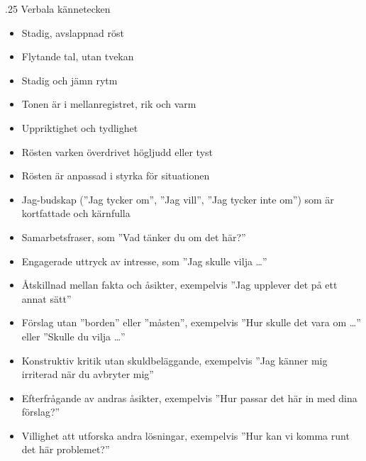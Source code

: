 \documentclass[swedish,a4paper]{book}
\makeatletter
\renewcommand\subsection{\@startsection{subsection}{1}{\z@}%
                                   {\baselineskip}%
                                   {.25\baselineskip}%
                                   {\fontsize{1\baselineskip}{1.25\baselineskip}\selectfont\sffamily\bfseries}} %
\makeatother
\begin{document}
\subsection{Verbala kännetecken}

\begin{itemize}

\item Stadig, avslappnad röst

\item Flytande tal, utan tvekan

\item Stadig och jämn rytm

\item Tonen är i mellanregistret, rik och varm

\item Uppriktighet och tydlighet

\item Rösten varken överdrivet högljudd eller tyst

\item Rösten är anpassad i styrka för situationen

\item Jag-budskap (''Jag tycker om'', ''Jag vill'', ''Jag tycker inte om'') som är kortfattade och kärnfulla

\item Samarbetsfraser, som ''Vad tänker du om det här?''

\item Engagerade uttryck av intresse, som ''Jag skulle vilja \ldots{}''

\item Åtskillnad mellan fakta och åsikter, exempelvis ''Jag upplever det på ett annat sätt''

\item Förslag utan ''borden'' eller ''måsten'', exempelvis ''Hur skulle det vara om \ldots{}'' eller ''Skulle du vilja \ldots{}''

\item Konstruktiv kritik utan skuldbeläggande, exempelvis ''Jag känner mig irriterad när du avbryter mig''

\item Efterfrågande av andras åsikter, exempelvis ''Hur passar det här in med dina förslag?''

\item Villighet att utforska andra lösningar, exempelvis ''Hur kan vi komma runt det här problemet?''

\end{itemize}
\end{document}
